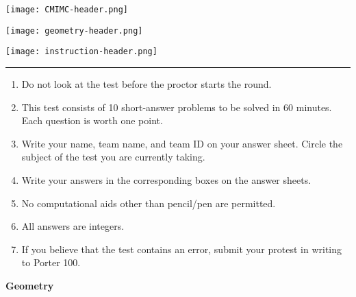 \documentclass[10pt]{article}
\newcounter{enum}
\begin{document}
\thispagestyle{empty}
\begin{center}

\vspace*{90pt}

\texttt{[image: CMIMC-header.png]}

\texttt{[image: geometry-header.png]}

\vspace{1.6in}

\texttt{[image: instruction-header.png]}
\noindent\rule{17.7cm}{2pt}
\end{center}

\vspace{10pt}

\begin{enumerate}
\large
\item Do not look at the test before the proctor starts the round.

\item This test consists of 10 short-answer problems to be solved in 60 minutes.
	Each question is worth one point.

\item Write your name, team name, and team ID on your answer sheet. Circle the
	subject of the test you are currently taking.

\item Write your answers in the corresponding boxes on the answer sheets.

\item No computational aids other than pencil/pen are permitted.

\item All answers are integers.

\item If you believe that the test contains an error, submit your protest in writing to Porter 100.
\end{enumerate}
\newpage

\begin{center}
\huge\textbf{Geometry}\normalsize

\vspace{3pt}
\end{center}
\end{document}
